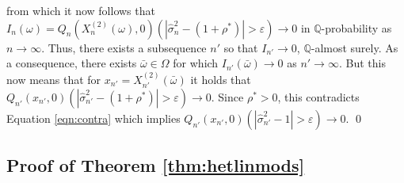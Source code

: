 \documentclass[preprint]{imsart}
\numberwithin{equation}{section}
\begin{document}
%  
from which it now follows that $I_n(\omega) = Q_n(X_n^{(2)}(\omega), 0)(|\hat{\sigma}^2_n - (1 + \rho^*)  | > \varepsilon ) \to 0$ in $\mathbb{Q}$-probability as $n \to \infty$. Thus, there exists a subsequence $n'$ so that $I_{n'} \to 0$, $\mathbb{Q}$-almost surely. As a consequence, there exists $\bar{\omega} \in \Omega$ for which $I_{n'}(\bar{\omega}) \to 0$ as $n' \to \infty$. But this now means that for $x_{n'} = X_{n'}^{(2)}(\bar{\omega})$ it holds that $Q_{n'}(x_{n'}, 0)(|\hat{\sigma}^2_{n'} - (1 + \rho^*)  | > \varepsilon ) \to 0$. Since $\rho^* > 0$, this contradicts Equation \eqref{eqn:contra} which implies $Q_{n'}(x_{n'}, 0)(|\hat{\sigma}^2_{n'} - 1  | > \varepsilon ) \to 0$.
 \hfill\qed
 



\subsection{Proof of Theorem \ref{thm:hetlinmods}}
\end{document}
